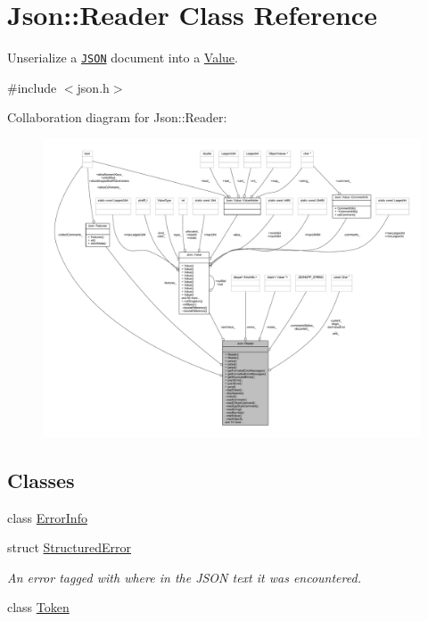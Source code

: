 \hypertarget{class_json_1_1_reader}{}\section{Json\+:\+:Reader Class Reference}
\label{class_json_1_1_reader}


Unserialize a \href{http://www.json.org}{\tt J\+S\+ON} document into a \hyperlink{class_json_1_1_value}{Value}.  




{\ttfamily \#include $<$json.\+h$>$}



Collaboration diagram for Json\+:\+:Reader\+:\nopagebreak
\begin{figure}[H]
\begin{center}
\leavevmode
\includegraphics[width=350pt]{class_json_1_1_reader__coll__graph}
\end{center}
\end{figure}
\subsection*{Classes}
\begin{DoxyCompactItemize}
\item 
class \hyperlink{class_json_1_1_reader_1_1_error_info}{Error\+Info}
\item 
struct \hyperlink{struct_json_1_1_reader_1_1_structured_error}{Structured\+Error}
\begin{DoxyCompactList}\small\item\em An error tagged with where in the J\+S\+ON text it was encountered. \end{DoxyCompactList}\item 
class \hyperlink{class_json_1_1_reader_1_1_token}{Token}
\end{DoxyCompactItemize}
